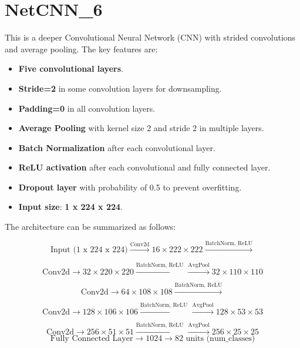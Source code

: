 \documentclass[12pt]{article}
\begin{document}
\section*{NetCNN\_6}
This is a deeper Convolutional Neural Network (CNN) with strided convolutions and average pooling. The key features are:
\begin{itemize}
    \item \textbf{Five convolutional layers}.
    \item \textbf{Stride=2} in some convolution layers for downsampling.
    \item \textbf{Padding=0} in all convolution layers.
    \item \textbf{Average Pooling} with kernel size 2 and stride 2 in multiple layers.
    \item \textbf{Batch Normalization} after each convolutional layer.
    \item \textbf{ReLU activation} after each convolutional and fully connected layer.
    \item \textbf{Dropout layer} with probability of 0.5 to prevent overfitting.
    \item \textbf{Input size}: \textbf{1 x 224 x 224}.
\end{itemize}

The architecture can be summarized as follows:

\[
\text{Input (1 x 224 x 224)} \xrightarrow{\text{Conv2d}} 16 \times 222 \times 222 \xrightarrow{\text{BatchNorm, ReLU}}
\]

\[
\text{Conv2d} \rightarrow 32 \times 220 \times 220 \xrightarrow{\text{BatchNorm, ReLU}} \xrightarrow{\text{AvgPool}} 32 \times 110 \times 110
\]

\[
\text{Conv2d} \rightarrow 64 \times 108 \times 108 \xrightarrow{\text{BatchNorm, ReLU}} 
\]

\[
\text{Conv2d} \rightarrow 128 \times 106 \times 106 \xrightarrow{\text{BatchNorm, ReLU}} \xrightarrow{\text{AvgPool}} 128 \times 53 \times 53
\]

\[
\text{Conv2d} \rightarrow 256 \times 51 \times 51 \xrightarrow{\text{BatchNorm, ReLU}} \xrightarrow{\text{AvgPool}} 256 \times 25 \times 25
\]
\[
\text{Fully Connected Layer} \rightarrow 1024 \rightarrow 82 \text{ units (num\_classes)}
\]

\end{document}
